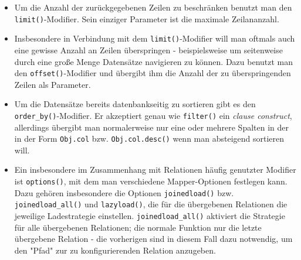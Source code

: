 \begin{itemize}
Eine Alternative zu \texttt{\&} und \texttt{|} sind die Funktionen
\texttt{and\_()} und \texttt{or\_()}. Sie verknüpfen alle ihre Parameter mit
\texttt{AND} bzw. \texttt{OR}. Da man seine Ausdrücke dadurch allerdings in
Polnischer Notation\footnote{Schreibweise für Ausdrücke, in der die Operanden
nach dem Operator kommen.} schreibt, senkt diese Variante die Lesbarkeit des
Codes. Daher ist es im Allgemeinen sinnvoller, die überladenen Operatoren zu
benutzen und sauber zu Klammern.

Wenn die Filter auf der obersten Ebene nur aus Konjunktionen bestehen kann man
sie auch einfach auf mehrere \texttt{filter()}-Aufrufe verteilen - wie schon bei
\texttt{filter\_by{}} werden die neuen Filter mit den alten per \texttt{AND}
verknüpft.

Neben Vergleichen sind auch andere Operatoren möglich. Der vermutlich Wichtigste
ist dabei der \texttt{IN}-Operator, mit dem man überprüft, ob eine Spalte einen
Wert aus einer Liste von Werten hat. Da man in Python den \texttt{in}-Operator
nicht überladen kann, ist er durch die Methode \texttt{Obj.col.in\_(lst)}
realisiert, wobei \texttt{lst} die Liste der Werte ist.
Wenn man einen Operator benutzen will, den SQLAlchemy nicht kennt, kann man ihn
mit der \texttt{Obj.col.op(oper)(arg)}-Methode aufrufen, wobei \texttt{oper} der
Operator und \texttt{arg} der rechte Operand ist.


\item Um die Anzahl der zurückgegebenen Zeilen zu beschränken benutzt man den
\texttt{limit()}-Modifier. Sein einziger Parameter ist die maximale
Zeilananzahl.


\item Insbesondere in Verbindung mit dem \texttt{limit()}-Modifier will man
oftmals auch eine gewisse Anzahl an Zeilen überspringen - beispielsweise um
seitenweise durch eine große Menge Datensätze navigieren zu können. Dazu benutzt
man den \texttt{offset()}-Modifier und übergibt ihm die Anzahl der zu
überspringenden Zeilen als Parameter.


\item Um die Datensätze bereits datenbankseitig zu sortieren gibt es den
\texttt{order\_by()}-Modifier. Er akzeptiert genau wie \texttt{filter()} ein
\emph{clause construct}, allerdings übergibt man normalerweise nur eine oder
mehrere Spalten in der in der Form \texttt{Obj.col} bzw. \texttt{Obj.col.desc()}
wenn man absteigend sortieren will.


\item Ein insbesondere im Zusammenhang mit Relationen häufig genutzter Modifier
ist \texttt{options()}, mit dem man verschiedene Mapper-Optionen festlegen kann.
Dazu gehören insbesondere die Optionen \texttt{joinedload()} bzw.
\texttt{joinedload\_all()} und \texttt{lazyload()}, die für die übergebenen
Relationen die jeweilige Ladestrategie einstellen. \texttt{joinedload\_all()}
aktiviert die Strategie für alle übergebenen Relationen; die normale Funktion nur
die letzte übergebene Relation - die vorherigen sind in diesem Fall dazu notwendig,
um den "Pfad" zur zu konfigurierenden Relation anzugeben.


\end{itemize}
